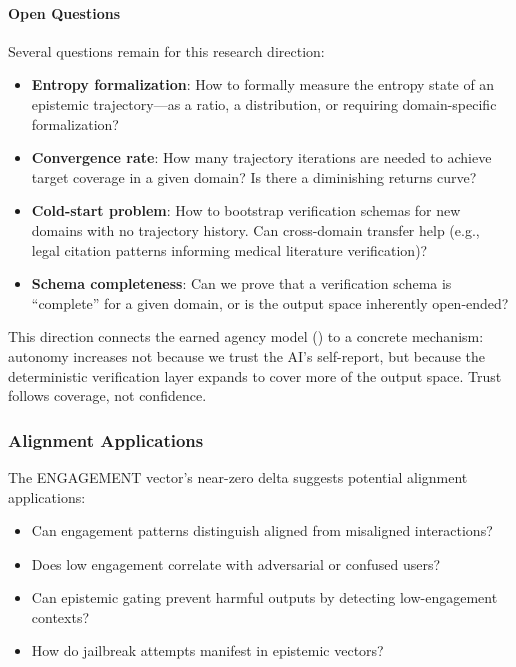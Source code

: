 \paragraph{Open Questions}

Several questions remain for this research direction:

\begin{itemize}
    \item \textbf{Entropy formalization}: How to formally measure the entropy state of an epistemic trajectory---as a ratio, a distribution, or requiring domain-specific formalization?
    \item \textbf{Convergence rate}: How many trajectory iterations are needed to achieve target coverage in a given domain? Is there a diminishing returns curve?
    \item \textbf{Cold-start problem}: How to bootstrap verification schemas for new domains with no trajectory history. Can cross-domain transfer help (e.g., legal citation patterns informing medical literature verification)?
    \item \textbf{Schema completeness}: Can we prove that a verification schema is ``complete'' for a given domain, or is the output space inherently open-ended?
\end{itemize}

This direction connects the earned agency model () to a concrete mechanism: autonomy increases not because we trust the AI's self-report, but because the deterministic verification layer expands to cover more of the output space. Trust follows coverage, not confidence.

\subsubsection{Alignment Applications}

The ENGAGEMENT vector's near-zero delta suggests potential alignment applications:

\begin{itemize}
    \item Can engagement patterns distinguish aligned from misaligned interactions?
    \item Does low engagement correlate with adversarial or confused users?
    \item Can epistemic gating prevent harmful outputs by detecting low-engagement contexts?
    \item How do jailbreak attempts manifest in epistemic vectors?
\end{itemize}

